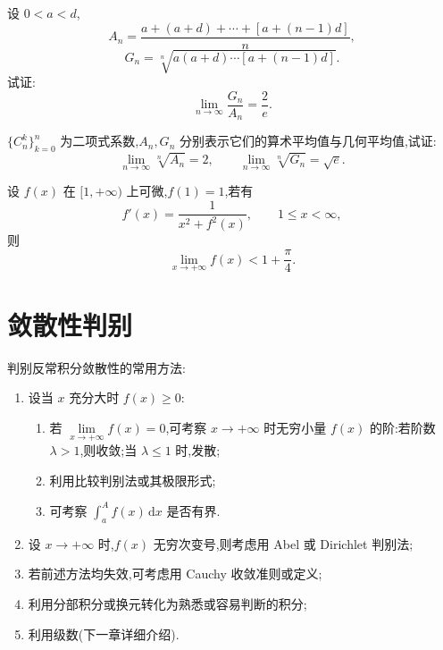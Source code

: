 \documentclass[../../数学分析培优讲义.tex]{subfiles}
\begin{document}
\begin{example}
设 $0<a<d$,
\[
    A_n=\dfrac{a+(a+d)+\cdots+[a+(n-1)d]}{n},
\]
\[
    G_n=\sqrt[n]{a(a+d)\cdots[a+(n-1)d]}.
\]
试证:
\[
    \lim\limits_{n\to\infty}\dfrac{G_n}{A_n}=\dfrac{2}{e}.
\]
\end{example}
\exampleblank

\begin{example}
$\{C_{n}^{k}\}_{k=0}^n$ 为二项式系数,$A_n,G_n$ 分别表示它们的算术平均值与几何平均值,试证:
\[
    \lim\limits_{n\to\infty}\sqrt[n]{A_n}=2,
    \qquad
    \lim\limits_{n\to\infty}\sqrt[n]{G_n}=\sqrt{e}.
\]
\end{example}
\exampleblank

\begin{example}
设 $f(x)$ 在 $\lbrack 1,+\infty)$ 上可微,$f(1)=1$,若有
\[
    f'(x)=\dfrac{1}{x^2+f^2(x)},
    \qquad 1\leq x<\infty,
\]
则
\[
    \lim\limits_{x\to+\infty}f(x)<1+\dfrac{\pi}{4}.
\]
\end{example}
\exampleblank


\newpage

\section{敛散性判别}

\begin{remark}
判别反常积分敛散性的常用方法:
\begin{enumerate}[label=(\arabic*)]
    \item 设当 $x$ 充分大时 $f(x)\geq0$:
    \begin{enumerate}[label=\textcircled{\arabic*}]
        \item 若 $\displaystyle\lim\limits_{x\to+\infty}f(x)=0$,可考察 $x\to+\infty$ 时无穷小量 $f(x)$ 的阶:若阶数 $\lambda>1$,则收敛;当 $\lambda\leq1$ 时,发散;
        \item 利用比较判别法或其极限形式;
        \item 可考察 $\displaystyle\int_a^Af(x)\,\mathrm{d}x$ 是否有界.
    \end{enumerate}
    \item 设 $x\to+\infty$ 时,$f(x)$ 无穷次变号,则考虑用 Abel 或 Dirichlet 判别法;
    \item 若前述方法均失效,可考虑用 Cauchy 收敛准则或定义;
    \item 利用分部积分或换元转化为熟悉或容易判断的积分;
    \item 利用级数(下一章详细介绍).
\end{enumerate}
\end{remark}
\end{document}
